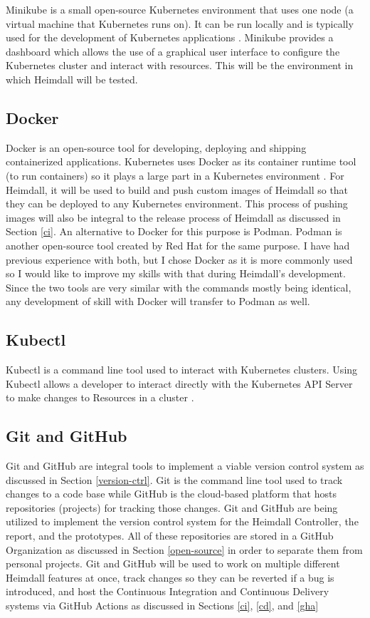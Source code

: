 \documentclass{article}
\begin{document}
Minikube is a small open-source Kubernetes environment that uses one node (a virtual machine that Kubernetes runs on). It can be run locally and is typically used for the development of Kubernetes applications \cite{minikube-docs}. Minikube provides a dashboard which allows the use of a graphical user interface to configure the Kubernetes cluster and interact with resources. This will be the environment in which Heimdall will be tested. 

 
\subsection{Docker}

Docker is an open-source tool for developing, deploying and shipping containerized applications. Kubernetes uses Docker as its container runtime tool (to run containers) so it plays a large part in a Kubernetes environment \cite{docker-overview}. For Heimdall, it will be used to build and push  custom images of Heimdall so that they can be deployed to any Kubernetes environment. This process of pushing images will also be integral to the release process of Heimdall as discussed in Section \ref{ci}. An alternative to Docker for this purpose is Podman. Podman is another open-source tool created by Red Hat for the same purpose. I have had previous experience with both, but I chose Docker as it is more commonly used so I would like to improve my skills with that during Heimdall's development. Since the two tools are very similar with the commands mostly being identical, any development of skill with Docker will transfer to Podman as well.


\subsection{Kubectl}

Kubectl is a command line tool used to interact with Kubernetes clusters. Using Kubectl allows a developer to interact directly with the Kubernetes API Server to make changes to Resources in a cluster \cite{k8s-tools}.



\subsection{Git and GitHub}

Git and GitHub are integral tools to implement a viable version control system as discussed in Section \ref{version-ctrl}. Git is the command line tool used to track changes to a code base while GitHub is the cloud-based platform that hosts repositories (projects) for tracking those changes. Git and GitHub are being utilized to implement the version control system for the Heimdall Controller, the report, and the prototypes. All of these repositories are stored in a GitHub Organization as discussed in Section \ref{open-source} in order to separate them from personal projects. Git and GitHub will be used to work on multiple different Heimdall features at once, track changes so they can be reverted if a bug is introduced, and host the Continuous Integration and Continuous Delivery systems via GitHub Actions as discussed in Sections \ref{ci}, \ref{cd}, and \ref{gha}
\end{document}
